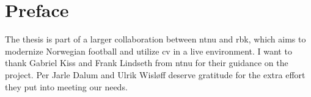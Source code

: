 \chapter*{Preface}

The thesis is part of a larger collaboration between \acrfull{ntnu} and \acrfull{rbk}, which aims to modernize Norwegian football and utilize \acrfull{cv} in a live environment. I want to thank Gabriel Kiss and Frank Lindseth from \acrshort{ntnu} for their guidance on the project. Per Jarle Dalum and Ulrik Wisløff deserve gratitude for the extra effort they put into meeting our needs.

